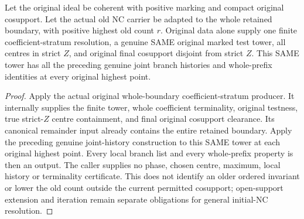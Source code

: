 \begin{theorem}
\label{hir:nc-original-boundary-stratum-joint-histories}
\leanok
Let the original ideal be coherent with positive marking and compact original
cosupport. Let the actual old NC carrier be adapted to the whole retained
boundary, with positive highest old count $r$. Original data alone supply one
finite coefficient-stratum resolution, a genuine SAME original marked test
tower, all centres in strict $Z$, and original final cosupport disjoint from
strict $Z$. This SAME tower has all the preceding genuine joint branch
histories and whole-prefix identities at every original highest point.
\end{theorem}
\begin{proof}
Apply the actual original whole-boundary coefficient-stratum producer. It
internally supplies the finite tower, whole coefficient terminality, original
testness, true strict-$Z$ centre containment, and final original cosupport
clearance. Its canonical remainder input already contains the entire retained
boundary. Apply the preceding genuine joint-history construction to this SAME
tower at each original highest point. Every local branch list and every
whole-prefix property is then an output. The caller supplies no phase,
chosen centre, maximum, local history or terminality certificate. This does
not identify an older ordered invariant or lower the old count outside the
current permitted cosupport; open-support extension and iteration remain
separate obligations for general initial-NC resolution.
\end{proof}
